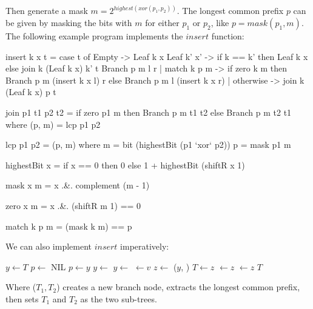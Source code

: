 \documentclass[b5paper]{article}
\begin{document}
Then generate a mask $m = 2^{highest(xor(p_1,p_2))}$. The longest common prefix $p$ can be given by masking the bits with $m$ for either $p_1$ or $p_2$, like $p = mask(p_1, m)$. The following example program implements the $insert$ function:

\begin{Haskell}
insert k x t
   = case t of
       Empty -> Leaf k x
       Leaf k' x' -> if k == k' then Leaf k x
                     else join k (Leaf k x) k' t
       Branch p m l r
          | match k p m -> if zero k m
                           then Branch p m (insert k x l) r
                           else Branch p m l (insert k x r)
          | otherwise -> join k (Leaf k x) p t

join p1 t1 p2 t2 = if zero p1 m then Branch p m t1 t2
                                else Branch p m t2 t1
    where
      (p, m) = lcp p1 p2

lcp p1 p2 = (p, m) where
    m = bit (highestBit (p1 `xor` p2))
    p = mask p1 m

highestBit x = if x == 0 then 0 else 1 + highestBit (shiftR x 1)

mask x m = x .&. complement (m - 1)

zero x m = x .&. (shiftR m 1) == 0

match k p m = (mask k m) == p
\end{Haskell}

We can also implement $insert$ imperatively:

\begin{algorithmic}[1]
    \State \Return {}
  \EndIf
  \State $y \gets T$
  \State $p \gets$ NIL
    \State $p \gets y$
      \State $y \gets$ 
    \Else
      \State $y \gets$ 
    \EndIf
  \EndWhile
    \State {} $\gets v$
  \Else
    \State $z \gets$ ($y$, )
      \State $T \gets z$
    \Else
        \State {} $\gets z$
      \Else
        \State {} $\gets z$
      \EndIf
    \EndIf
  \EndIf
  \State \Return $T$
\EndFunction
\end{algorithmic}

Where ($T_1, T_2$) creates a new branch node, extracts the longest common prefix, then sets $T_1$ and $T_2$ as the two sub-trees.
\end{document}
